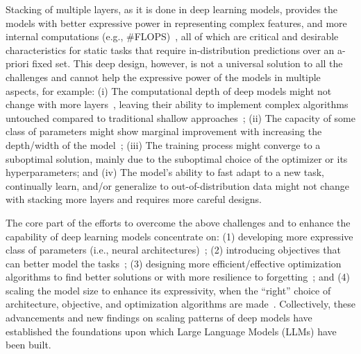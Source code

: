 Stacking of multiple layers, as it is done in deep learning models, provides the models with better expressive power in representing complex features, and more internal computations (e.g., \#FLOPS)~\citep{montufar2014number, poole2016exponential, hestness2017deep}, all of which are critical and desirable characteristics for static tasks that require in-distribution predictions over an a-priori fixed set. This deep design, however, is not a universal solution to all the challenges and cannot help the expressive power of the models in multiple aspects, for example: (i) The computational depth of deep models might not change with more layers~\citep{merrill2022saturated, sanford2024transformers}, leaving their ability to implement complex algorithms untouched compared to traditional shallow approaches~\citep{merrill2024the}; (ii) The capacity of some class of parameters might show marginal improvement with increasing the depth/width of the model~\citep{kaplan2020scaling}; (iii) The training process might converge to a suboptimal solution, mainly due to the suboptimal choice of the optimizer or its hyperparameters; and (iv) The model's ability to fast adapt to a new task, continually learn, and/or generalize to out-of-distribution data might not change with stacking more layers and requires more careful designs. 

The core part of the efforts to overcome the above challenges and to enhance the capability of deep learning models concentrate on: (1) developing more expressive class of parameters (i.e., neural architectures)~\citep{LSTM, fukushima1980neocognitron, transformers, krizhevsky2012imagenet, behrouz2024titans}; (2) introducing objectives that can better model the tasks~\citep{rumelhart1986learning, goodfellow2020generative, alshammari2025unifying, kingma2014autoencoding, hjelm2018learning};  (3) designing more efficient/effective optimization algorithms to find better solutions or with more resilience to forgetting~\citep{kingma2014adam, jordanmuon, gupta2018shampoo, farajtabar2020orthogonal}; and (4) scaling the model size to enhance its expressivity, when the ``right'' choice of architecture, objective, and optimization algorithms are made~\citep{hoffmann2022training, brown2020language, kaplan2020scaling}. Collectively, these advancements and new findings on scaling patterns of deep models have established the foundations upon which Large Language Models (LLMs) have been built.


